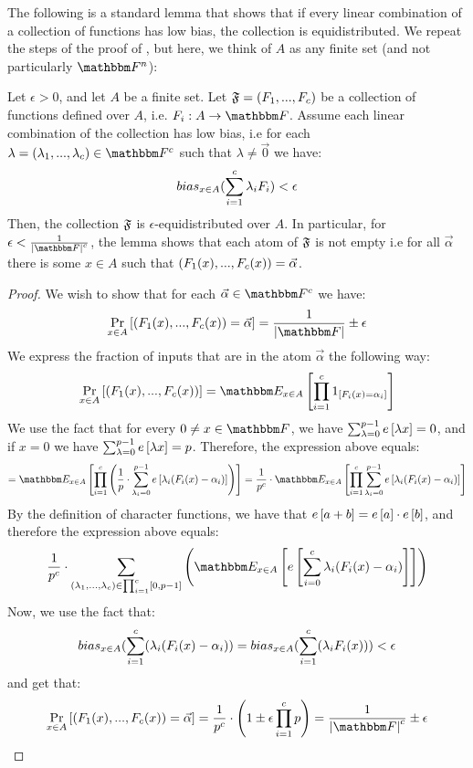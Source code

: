 The following is a standard lemma that shows that if every linear combination of a collection of functions has low bias, the collection is equidistributed.
We repeat the steps of the proof of \cite[Lemma 7.24]{book}, but here, we think of $A$ as any finite set (and not particularly $\field$):
\begin{lemma}\label{every-linear-combination-has-low-bias-implies-equidistribution}
Let $\epsilon > 0$, and let $A$ be a finite set.
Let $\genfuncset = (\genfunc_1,...,\genfunc_c)$ be a collection of functions defined over $A$, i.e. $\funcdef{\genfunc_i}{A}{\basefield}$.
Assume each linear combination of the collection has low bias, i.e for each $\lambda = (\lambda_1,...,\lambda_c) \in \basefield^c$ such that $\lambda \neq \vec{0}$ we have:
\[
    \relbias{x \in A}{\sum_{i=1}^{c}{\lambda_i \genfunc_i}} < \epsilon
\]
Then, the collection $\genfuncset$ is $\epsilon$-equidistributed over $A$.
\newline
In particular, for $\epsilon < \frac{1}{\abs{\basefield}^c}$, the lemma shows that each atom of $\genfuncset$ is not empty i.e for all $\vec{\alpha}$ there is some $x \in A$ such that $(\genfunc_1(x),...,\genfunc_c(x)) = \vec{\alpha}$.
\end{lemma}
\begin{proof}
    We wish to show that for each $\vec{\alpha} \in \basefield^c$ we have:
    \[
        \prex{x \in A}{(\genfunc_1(x),...,\genfunc_c(x)) = \vec{\alpha}} = \frac{1}{\abs{\basefield}} \pm \epsilon
    \]
    We express the fraction of inputs that are in the atom $\vec{\alpha}$ the following way:
    \[
        \prex{x \in A}{(\genfunc_1(x),...,\genfunc_c(x))} =
        \expectation{x \in A}{\prod_{i=1}^c {1_{[\genfunc_i(x) = \alpha_i]}}}
    \]
    We use the fact that for every $0 \neq x \in \basefield$, we have $\sum_{\lambda = 0}^{p - 1} e \left[ \lambda x \right] = 0$,
    and if $x = 0$ we have $\sum_{\lambda = 0}^{p - 1} e \left[ \lambda x \right] = p$.
    Therefore, the expression above equals:
    \[
        =\expectation{x \in A}{\prod_{i=1}^c \parens {{\frac{1}{\basefieldsize} \cdot \sum_{\lambda_i = 0}^{\basefieldsize - 1} {\charfunc{\lambda_i (\genfunc_i(x) - \alpha_i)}}}}} =\\
        \frac{1}{\basefieldsize^c} \cdot {\expectation{x \in A}{\prod_{i=1}^c \sum_{\lambda_i = 0}^{\basefieldsize - 1} {\charfunc{\lambda_i (\genfunc_i(x) - \alpha_i)}}}}
    \]
    By the definition of character functions, we have that $e \left[ a+b \right] = e \left[ a \right] \cdot e \left[ b \right]$, and therefore the expression above equals:
    \[
        \frac{1}{\basefieldsize^c} \cdot \sum_{(\lambda_1,...,\lambda_c) \in \prod_{i=1}^c [0, \basefieldsize - 1]} \parens{\expectation{x \in A}{\charfunc{\sum_{i = 0}^{c} {\lambda_i (\genfunc_i(x) - \alpha_i)}}}}
    \]
    Now, we use the fact that:
    \[
        \relbias{x \in A}{\sum_{i=1}^c (\lambda_i (\genfunc_i(x) -\alpha_i)} = \relbias{x \in A}{\sum_{i=1}^c (\lambda_i \genfunc_i(x))} < \epsilon
    \]
    and get that:
    \[
        \prex{x \in A}{(\genfunc_1(x),...,\genfunc_c(x)) = \vec{\alpha}} = \frac{1}{\basefieldsize^c} \cdot \parens{1 \pm \epsilon \prod_{i=1}^c{\basefieldsize}} = \frac{1}{\abs{\basefield}^c} \pm \epsilon
    \]
\end{proof}

